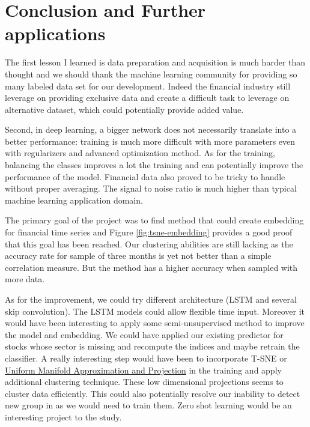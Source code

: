 \documentclass[a4paper,twoside]{article}
\begin{document}
\section{Conclusion and Further applications}
\label{sec:org8bd0427}

The first lesson I learned is data preparation and acquisition is much harder
than thought and we should thank the machine learning community for providing
so many labeled data set for our development. Indeed the financial industry
still leverage on providing exclusive data and create a difficult task to
leverage on alternative dataset, which could potentially provide added value.

Second, in deep learning, a bigger network does not necessarily translate into
a better performance: training is much more difficult with more parameters
even with regularizers and advanced optimization method. As for the training,
balancing the classes improves a lot the training and can potentially improve
the performance of the model. Financial data also proved to be tricky to
handle without proper averaging. The signal to noise ratio is much higher than
typical machine learning application domain.

The primary goal of the project was to find method that could create embedding
for financial time series and Figure \ref{fig:tsne-embedding} provides a good
proof that this goal has been reached. Our clustering abilities are still
lacking as the accuracy rate for sample of three months is yet not better than
a simple correlation measure. But the method has a higher accuracy when
sampled with more data. 

As for the improvement, we could try different architecture (LSTM and several
skip convolution). The LSTM models could allow flexible time input. Moreover
it would have been interesting to apply some semi-unsupervised method to
improve the model and embedding. We could have applied our existing predictor
for stocks whose sector is missing and recompute the indices and maybe retrain
the classifier. A really interesting step would have been to incorporate T-SNE
or \href{https://github.com/lmcinnes/umap}{Uniform Manifold Approximation and Projection} in the training and apply
additional clustering technique. These low dimensional projections seems to
cluster data efficiently. This could also potentially resolve our inability to
detect new group in as we would need to train them. Zero shot learning would
be an interesting project to the study.
\end{document}
